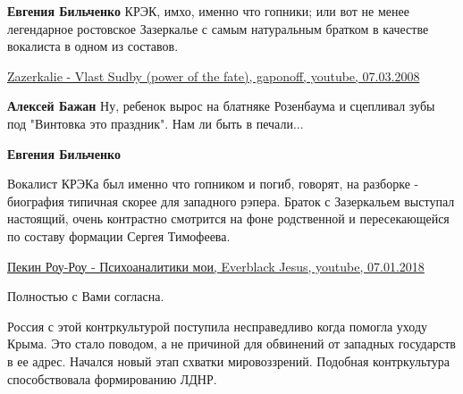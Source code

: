 \begin{itemize}
\begin{itemize}
\textbf{Евгения Бильченко} КРЭК, имхо, именно что гопники; или вот не менее легендарное ростовское Зазеркалье с самым натуральным братком в качестве вокалиста в одном из составов.

\href{https://www.youtube.com/watch?v=DqLf7WAZp0M}{%
Zazerkalie - Vlast Sudby (power of the fate), gaponoff, youtube, 07.03.2008%
}

 
\textbf{Алексей Бажан} Ну, ребенок вырос на блатняке Розенбаума и сцепливал зубы под "Винтовка это праздник". Нам ли быть в печали...

 
\textbf{Евгения Бильченко} 

Вокалист КРЭКа был именно что гопником и погиб, говорят, на разборке -
биография типичная скорее для западного рэпера. Браток с Зазеркальем выступал
настоящий, очень контрастно смотрится на фоне родственной и пересекающейся по
составу формации Сергея Тимофеева. 

\href{https://www.youtube.com/watch?v=3hw_sMNrbDA}{%
Пекин Роу-Роу - Психоаналитики мои, Everblack Jesus, youtube, 07.01.2018%
}

\end{itemize}

 
Полностью с Вами согласна.

 

Россия с этой контркультурой поступила несправедливо когда помогла уходу Крыма.
Это стало поводом, а не причиной для обвинений от западных государств в ее
адрес. Начался новый этап схватки мировоззрений. Подобная контркультура
способствовала формированию ЛДНР.


\end{itemize}
